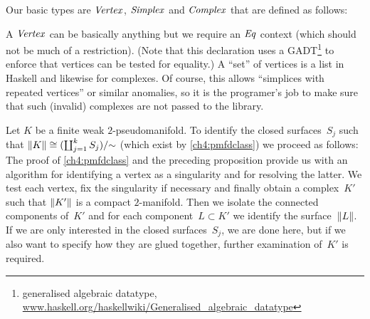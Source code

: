 Our basic types are \ensuremath{\Conid{Vertex}}, \ensuremath{\Conid{Simplex}} and \ensuremath{\Conid{Complex}} that are defined as
follows:
\resethooks
A \ensuremath{\Conid{Vertex}} can be basically anything but we require an \ensuremath{\Conid{Eq}} context
(which should not be much of a restriction). (Note that this declaration
uses a GADT\footnote{generalised algebraic datatype,
\href{http://www.haskell.org/haskellwiki/Generalised_algebraic_datatype}{%
\url{www.haskell.org/haskellwiki/Generalised_algebraic_datatype}}}
to enforce that vertices can be tested for equality.) A \enquote{set}
of vertices is a list in Haskell and likewise for complexes. Of course,
this allows \enquote{simplices with repeated vertices} or similar anomalies,
so it is the programer's job to make sure that such (invalid) complexes
are not passed to the library.

Let $K$ be a finite weak $2$-pseudomanifold. To identify the closed
surfaces~$S_j$ such that $\lVert K\rVert \cong (\coprod_{j=1}^k S_j)/{\sim}$ 
(which exist by \cref{ch4:pmfdclass}) we proceed as follows:
The proof of \cref{ch4:pmfdclass} and the preceding proposition provide us with an
algorithm for identifying a vertex as a singularity and for resolving the
latter. We test each vertex, fix the singularity if necessary and finally
obtain a complex~$K'$ such that $\lVert K'\rVert$ is a compact $2$-manifold. Then
we isolate the connected components of~$K'$ and for each component~$L\subset K'$
we identify the surface~$\lVert L\rVert$. If we are only interested in the closed
surfaces~$S_j$, we are done here, but if we also want to specify how they
are glued together, further examination of~$K'$ is required.


